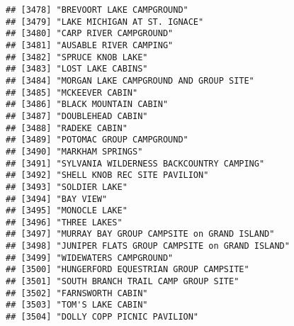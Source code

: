 \documentclass[
]{article}
\begin{document}
\begin{verbatim}
## [3478] "BREVOORT LAKE CAMPGROUND"                                                            
## [3479] "LAKE MICHIGAN AT ST. IGNACE"                                                         
## [3480] "CARP RIVER CAMPGROUND"                                                               
## [3481] "AUSABLE RIVER CAMPING"                                                               
## [3482] "SPRUCE KNOB LAKE"                                                                    
## [3483] "LOST LAKE CABINS"                                                                    
## [3484] "MORGAN LAKE CAMPGROUND AND GROUP SITE"                                               
## [3485] "MCKEEVER CABIN"                                                                      
## [3486] "BLACK MOUNTAIN CABIN"                                                                
## [3487] "DOUBLEHEAD CABIN"                                                                    
## [3488] "RADEKE CABIN"                                                                        
## [3489] "POTOMAC GROUP CAMPGROUND"                                                            
## [3490] "MARKHAM SPRINGS"                                                                     
## [3491] "SYLVANIA WILDERNESS BACKCOUNTRY CAMPING"                                             
## [3492] "SHELL KNOB REC SITE PAVILION"                                                        
## [3493] "SOLDIER LAKE"                                                                        
## [3494] "BAY VIEW"                                                                            
## [3495] "MONOCLE LAKE"                                                                        
## [3496] "THREE LAKES"                                                                         
## [3497] "MURRAY BAY GROUP CAMPSITE on GRAND ISLAND"                                           
## [3498] "JUNIPER FLATS GROUP CAMPSITE on GRAND ISLAND"                                        
## [3499] "WIDEWATERS CAMPGROUND"                                                               
## [3500] "HUNGERFORD EQUESTRIAN GROUP CAMPSITE"                                                
## [3501] "SOUTH BRANCH TRAIL CAMP GROUP SITE"                                                  
## [3502] "FARNSWORTH CABIN"                                                                    
## [3503] "TOM'S LAKE CABIN"                                                                    
## [3504] "DOLLY COPP PICNIC PAVILION"                                                          

\end{verbatim}
\end{document}
